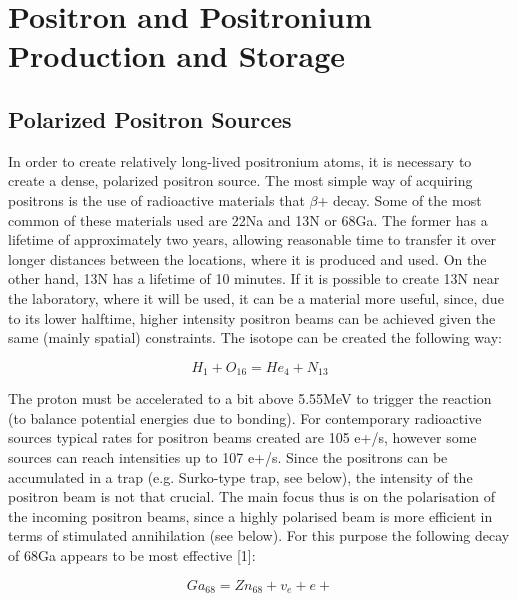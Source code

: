 
\chapter{Positron and Positronium Production and Storage} %

\label{Chapter2} %

\section{Polarized Positron Sources}

In order to create relatively long-lived positronium atoms, it is necessary to create a dense, polarized positron source. The most simple way of acquiring positrons is the use of radioactive materials that $\beta$+ decay. Some of the most common of these materials used are 22Na and 13N or 68Ga. The former has a lifetime of approximately two years, allowing reasonable time to transfer it over longer distances between the locations, where it is produced and used. On the other hand, 13N has a lifetime of 10 minutes. If it is possible to create 13N near the laboratory, where it will be used, it can be a material more useful, since, due to its lower halftime, higher intensity positron beams can be achieved given the same (mainly spatial) constraints. The isotope can be created the following way:

\begin{equation}
\label{e1}
H_1 + O_{16} = He_4 + N_{13}
\end{equation}

The proton must be accelerated to a bit above 5.55MeV to trigger the reaction (to balance potential energies due to bonding). For contemporary radioactive sources typical rates for positron beams created are 105 e+/s, however some sources can reach intensities up to 107 e+/s.
Since the positrons can be accumulated in a trap (e.g. Surko-type trap, see below), the intensity of the positron beam is not that crucial. The main focus thus is on the polarisation of the incoming positron beams, since a highly polarised beam is more efficient in terms of stimulated annihilation (see below). For this purpose the following decay of 68Ga appears to be most effective [1]:

\begin{equation}
\label{e2}
Ga_{68} = Zn_{68} + v_e + e+
\end{equation}


